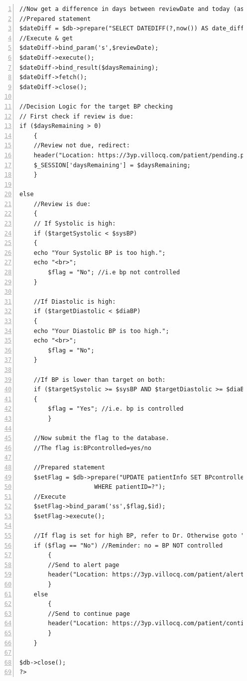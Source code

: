\documentclass[11pt]{article}
\begin{document}
\begin{lstlisting}[numbers=left,frame=lines,label=patient-submit-form,showstringspaces=false]
//Now get a difference in days between reviewDate and today (as DaysRemaining)
//Prepared statement
$dateDiff = $db->prepare("SELECT DATEDIFF(?,now()) AS date_difference");
//Execute & get
$dateDiff->bind_param('s',$reviewDate);
$dateDiff->execute();
$dateDiff->bind_result($daysRemaining);
$dateDiff->fetch();
$dateDiff->close();

//Decision Logic for the target BP checking
// First check if review is due:
if ($daysRemaining > 0)
    {
    //Review not due, redirect:
    header("Location: https://3yp.villocq.com/patient/pending.php"); 
    $_SESSION['daysRemaining'] = $daysRemaining;
    }
    
else
    //Review is due:
    {
    // If Systolic is high:
    if ($targetSystolic < $sysBP)
	{  
	echo "Your Systolic BP is too high.";
	echo "<br>";
        $flag = "No"; //i.e bp not controlled
	}
    
    //If Diastolic is high:
    if ($targetDiastolic < $diaBP)
	{  
	echo "Your Diastolic BP is too high.";
	echo "<br>";
        $flag = "No";
	}

    //If BP is lower than target on both:
    if ($targetSystolic >= $sysBP AND $targetDiastolic >= $diaBP)
	{
        $flag = "Yes"; //i.e. bp is controlled
        }
    
    //Now submit the flag to the database.
    //The flag is:BPcontrolled=yes/no
    
    //Prepared statement
    $setFlag = $db->prepare("UPDATE patientInfo SET BPcontrolled=? 
    			     WHERE patientID=?");
    //Execute
    $setFlag->bind_param('ss',$flag,$id);
    $setFlag->execute();
    
    //If flag is set for high BP, refer to Dr. Otherwise goto 'success' page:
    if ($flag == "No") //Reminder: no = BP NOT controlled
        { 
        //Send to alert page
        header("Location: https://3yp.villocq.com/patient/alert.php");
        }
    else
        {
        //Send to continue page
        header("Location: https://3yp.villocq.com/patient/continue.html");
        }
    }
    
$db->close();
?>
\end{lstlisting}
\end{document}
